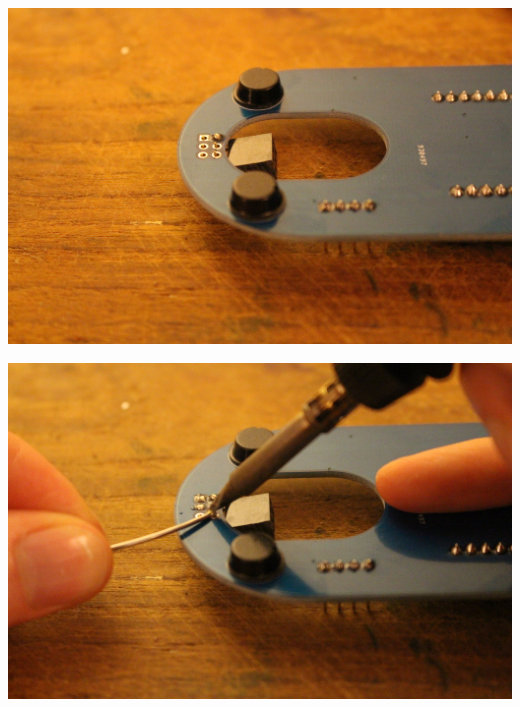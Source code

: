 \documentclass{article}
\begin{document}
\begin{minipage}[b]{0.5\textwidth}
	\includegraphics[width=\textwidth]{Bilder2019/IMG_6486.JPG}
\end{minipage}
\begin{minipage}[b]{0.5\textwidth}
	\includegraphics[width=\textwidth]{Bilder2019/IMG_6487.JPG}
\end{minipage}

\vspace{0.5cm}
\end{document}
